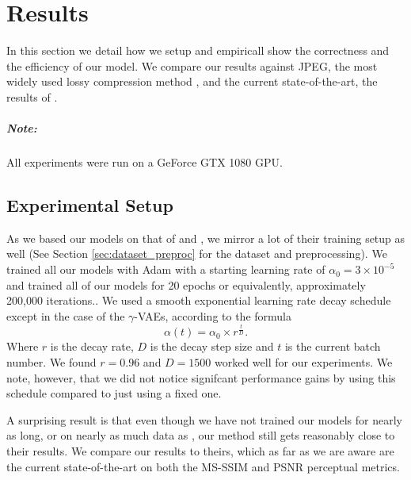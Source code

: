 
\chapter{Results}
\label{chapter:experiments}

\graphicspath{{../img/plots/vae_latents/}{../img/plots/kodak_comparison/}{../img/plots/kodak_coding_time/}{../img/plots/kodak_side_info/}}

\label{sec:experimental_results}
\par
In this section we detail how we setup and empiricall show the correctness and
the efficiency of our model. We compare our results against JPEG, the most
widely used lossy compression method \cite{bull2014communicating}, and the
current state-of-the-art, the results of \cite{balle2018variational}\footnotemark.
\cite{zhao2015loss}


\paragraph{Note:} All experiments were run on a GeForce GTX 1080 GPU.

\section{Experimental Setup}
\par
As we based our models on that of \cite{balle2016end} and
\cite{balle2018variational}, we mirror a lot of their training setup as well
(See Section \ref{sec:dataset_preproc} for the dataset and preprocessing). We
trained all our models with Adam with a starting learning rate of $\alpha_0 =
3 \times 10^{-5}$ and trained all of our models for 20 epochs or equivalently,
approximately 200,000 iterations.. We used a smooth
exponential learning rate decay schedule except in the case of the
$\gamma$-VAEs, according to the formula
\[
  \alpha(t) = \alpha_0 \times r^{\frac{t}{D}}.
\]
Where $r$ is the decay rate, $D$ is the decay step size and $t$ is the current
batch number. We found $r = 0.96$ and $D = 1500$ worked well for our
experiments. We note, however, that we did not notice signifcant performance
gains by using this schedule compared to just using a fixed one.
\par
A surprising result is that even though we have not trained our models for
nearly as long, or on nearly as much data as \cite{balle2018variational}, our
method still gets reasonably close to their results. We compare our results to
theirs, which as far as we are aware are the current state-of-the-art on both
the MS-SSIM and PSNR perceptual metrics.

